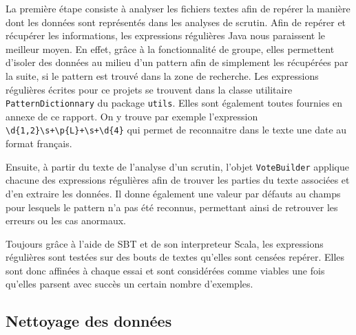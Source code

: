 La première étape consiste à analyser les fichiers textes afin de repérer la manière dont les données sont représentés dans les analyses de scrutin. Afin de repérer et récupérer les informations, les expressions régulières Java nous paraissent le meilleur moyen. En effet, grâce à la fonctionnalité de groupe, elles permettent d'isoler des données au milieu d'un pattern afin de simplement les récupérées par la suite, si le pattern est trouvé dans la zone de recherche. Les expressions régulières écrites pour ce projets se trouvent dans la classe utilitaire \verb|PatternDictionnary| du package \verb|utils|. Elles sont également toutes fournies en annexe de ce rapport. On y trouve par exemple l'expression \verb|\d{1,2}\s+\p{L}+\s+\d{4}| qui permet de reconnaitre dans le texte une date au format français.

Ensuite, à partir du texte de l'analyse d'un scrutin, l'objet \verb|VoteBuilder| applique chacune des expressions régulières afin de trouver les parties du texte associées et d'en extraire les données. Il donne également une valeur par défauts au champs pour lesquels le pattern n'a pas été reconnus, permettant ainsi de retrouver les erreurs ou les cas anormaux.

Toujours grâce à l'aide de SBT et de son interpreteur Scala, les expressions régulières sont testées sur des bouts de textes qu'elles sont censées repérer. Elles sont donc affinées à chaque essai et sont considérées comme viables une fois qu'elles parsent avec succès un certain nombre d'exemples.

\subsection{Nettoyage des données}
